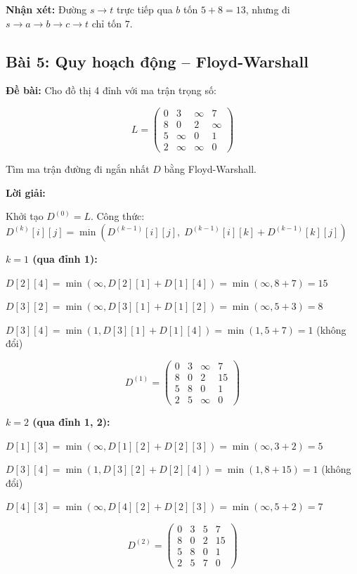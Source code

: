 \documentclass[10pt]{article}
\begin{document}
\textbf{Nhận xét:} Đường $s \to t$ trực tiếp qua $b$ tốn $5 + 8 = 13$, nhưng đi $s \to a \to b \to c \to t$ chỉ tốn $\boxed{7}$.

\subsection{Bài 5: Quy hoạch động -- Floyd-Warshall}

\textbf{Đề bài:} Cho đồ thị 4 đỉnh với ma trận trọng số:

$$L = \begin{pmatrix} 0 & 3 & \infty & 7 \\ 8 & 0 & 2 & \infty \\ 5 & \infty & 0 & 1 \\ 2 & \infty & \infty & 0 \end{pmatrix}$$

Tìm ma trận đường đi ngắn nhất $D$ bằng Floyd-Warshall.

\textbf{Lời giải:}

Khởi tạo $D^{(0)} = L$. Công thức: $D^{(k)}[i][j] = \min(D^{(k-1)}[i][j], \; D^{(k-1)}[i][k] + D^{(k-1)}[k][j])$

\textbf{$k = 1$ (qua đỉnh 1):}

$D[2][4] = \min(\infty, D[2][1] + D[1][4]) = \min(\infty, 8 + 7) = 15$

$D[3][2] = \min(\infty, D[3][1] + D[1][2]) = \min(\infty, 5 + 3) = 8$

$D[3][4] = \min(1, D[3][1] + D[1][4]) = \min(1, 5 + 7) = 1$ (không đổi)

$$D^{(1)} = \begin{pmatrix} 0 & 3 & \infty & 7 \\ 8 & 0 & 2 & 15 \\ 5 & 8 & 0 & 1 \\ 2 & 5 & \infty & 0 \end{pmatrix}$$

\textbf{$k = 2$ (qua đỉnh 1, 2):}

$D[1][3] = \min(\infty, D[1][2] + D[2][3]) = \min(\infty, 3 + 2) = 5$

$D[3][4] = \min(1, D[3][2] + D[2][4]) = \min(1, 8 + 15) = 1$ (không đổi)

$D[4][3] = \min(\infty, D[4][2] + D[2][3]) = \min(\infty, 5 + 2) = 7$

$$D^{(2)} = \begin{pmatrix} 0 & 3 & 5 & 7 \\ 8 & 0 & 2 & 15 \\ 5 & 8 & 0 & 1 \\ 2 & 5 & 7 & 0 \end{pmatrix}$$
\end{document}
